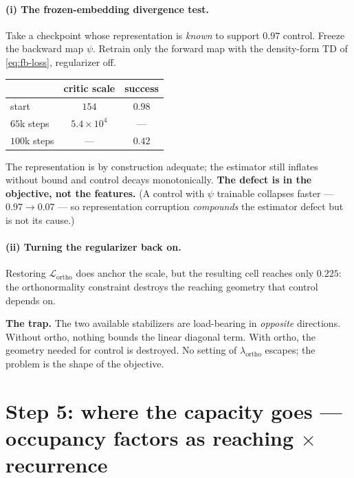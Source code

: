 \documentclass[11pt]{article}
\begin{document}
\paragraph{(i) The frozen-embedding divergence test.} Take a checkpoint whose
representation is \emph{known} to support $0.97$ control. Freeze the backward map
$\psi$. Retrain only the forward map with the density-form TD of
\eqref{eq:fb-loss}, regularizer off.
\begin{center}
\begin{tabular}{lcc}
\toprule
& critic scale & success \\
\midrule
start & $154$ & $0.98$ \\
$65$k steps & $5.4\times10^{4}$ & --- \\
$100$k steps & --- & $0.42$ \\
\bottomrule
\end{tabular}
\end{center}
The representation is by construction adequate; the estimator still inflates
without bound and control decays monotonically. \textbf{The defect is in the
objective, not the features.} (A control with $\psi$ trainable collapses
faster --- $0.97\to0.07$ --- so representation corruption \emph{compounds} the
estimator defect but is not its cause.)

\paragraph{(ii) Turning the regularizer back on.} Restoring
$\mathcal{L}_{\mathrm{ortho}}$ does anchor the scale, but the resulting cell
reaches only $0.225$: the orthonormality constraint destroys the reaching geometry
that control depends on.

\begin{keybox}
\textbf{The trap.} The two available stabilizers are load-bearing in
\emph{opposite} directions. Without ortho, nothing bounds the linear diagonal
term. With ortho, the geometry needed for control is destroyed. No setting of
$\lambda_{\mathrm{ortho}}$ escapes; the problem is the shape of the objective.
\end{keybox}

\section{Step 5: where the capacity goes --- occupancy factors as reaching $\times$ recurrence}
\label{sec:factor}
\end{document}
